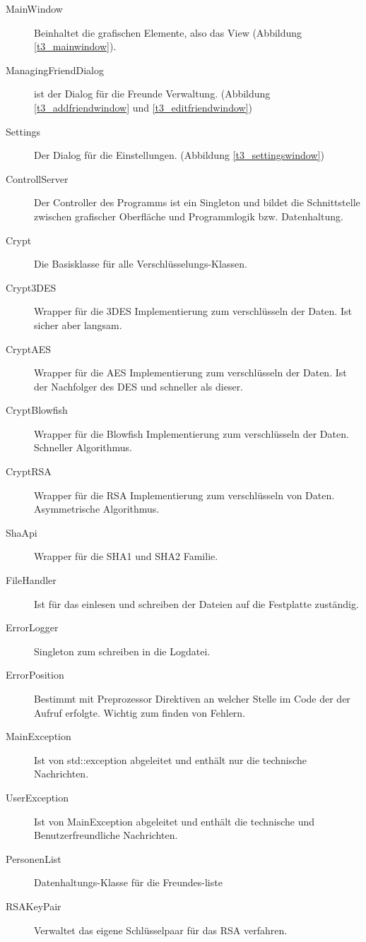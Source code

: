 \documentclass[12pt,a4paper,titlepage]{article}
\begin{document}
\begin{description}
	\item[MainWindow] Beinhaltet die grafischen Elemente, also das View (Abbildung \ref{t3_mainwindow}).
	\item[ManagingFriendDialog] ist der Dialog für die Freunde Verwaltung. (Abbildung \ref{t3_addfriendwindow} und \ref{t3_editfriendwindow})
	\item[Settings] Der Dialog für die Einstellungen. (Abbildung \ref{t3_settingswindow})
	\item[ControllServer] Der Controller des Programms ist ein Singleton und bildet die Schnittstelle zwischen grafischer Oberfläche und Programmlogik bzw. Datenhaltung.
    \item[Crypt]  Die Basisklasse für alle Verschlüsselungs-Klassen.
    \item[Crypt3DES] Wrapper für die 3DES Implementierung zum verschlüsseln der Daten. Ist sicher aber langsam.
    \item[CryptAES] Wrapper für die AES Implementierung zum verschlüsseln der Daten. Ist der Nachfolger des DES und schneller als dieser.
    \item[CryptBlowfish] Wrapper für die Blowfish Implementierung zum verschlüsseln der Daten. Schneller Algorithmus.
    \item[CryptRSA] Wrapper für die RSA Implementierung zum verschlüsseln von Daten. Asymmetrische Algorithmus.
    \item[ShaApi] Wrapper für die SHA1 und SHA2 Familie.
    \item[FileHandler] Ist für das einlesen und schreiben der Dateien auf die Festplatte zuständig.
    \item[ErrorLogger] Singleton zum schreiben in die Logdatei.
    \item[ErrorPosition] Bestimmt mit Preprozessor Direktiven an welcher Stelle im Code der der Aufruf erfolgte. Wichtig zum finden von Fehlern.
    \item[MainException] Ist von std::exception abgeleitet und enthält nur die technische Nachrichten.
    \item[UserException] Ist von MainException abgeleitet und enthält die technische und Benutzerfreundliche Nachrichten.    
    \item[PersonenList] Datenhaltungs-Klasse für die Freundes-liste
    \item[RSAKeyPair] Verwaltet das eigene Schlüsselpaar für das RSA verfahren.
  \end{description}
\end{document}
